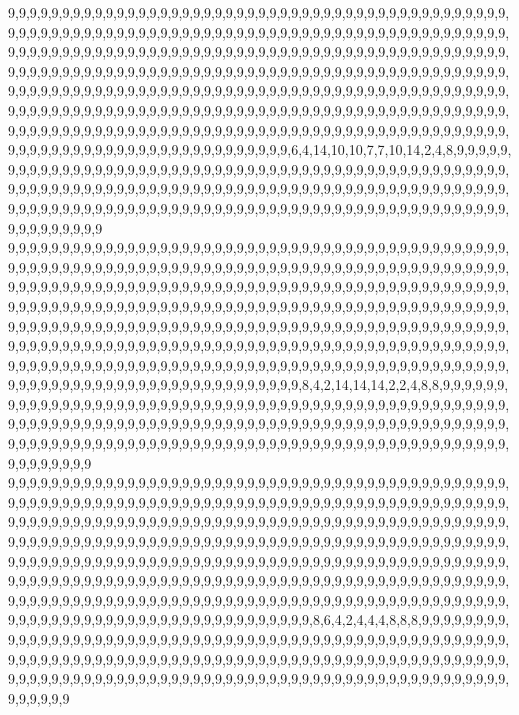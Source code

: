 9,9,9,9,9,9,9,9,9,9,9,9,9,9,9,9,9,9,9,9,9,9,9,9,9,9,9,9,9,9,9,9,9,9,9,9,9,9,9,9,9,9,9,9,9,9,9,9,9,9,9,9,9,9,9,9,9,9,9,9,9,9,9,9,9,9,9,9,9,9,9,9,9,9,9,9,9,9,9,9,9,9,9,9,9,9,9,9,9,9,9,9,9,9,9,9,9,9,9,9,9,9,9,9,9,9,9,9,9,9,9,9,9,9,9,9,9,9,9,9,9,9,9,9,9,9,9,9,9,9,9,9,9,9,9,9,9,9,9,9,9,9,9,9,9,9,9,9,9,9,9,9,9,9,9,9,9,9,9,9,9,9,9,9,9,9,9,9,9,9,9,9,9,9,9,9,9,9,9,9,9,9,9,9,9,9,9,9,9,9,9,9,9,9,9,9,9,9,9,9,9,9,9,9,9,9,9,9,9,9,9,9,9,9,9,9,9,9,9,9,9,9,9,9,9,9,9,9,9,9,9,9,9,9,9,9,9,9,9,9,9,9,9,9,9,9,9,9,9,9,9,9,9,9,9,9,9,9,9,9,9,9,9,9,9,9,9,9,9,9,9,9,9,9,9,9,9,9,9,9,9,9,9,9,9,9,9,9,9,9,9,9,9,9,9,9,9,9,9,9,9,9,9,9,9,9,9,9,9,9,9,9,9,9,9,9,9,9,9,9,9,9,9,9,9,9,9,9,9,9,9,9,9,9,9,9,9,9,9,9,9,9,9,9,9,9,9,9,6,4,14,10,10,7,7,10,14,2,4,8,9,9,9,9,9,9,9,9,9,9,9,9,9,9,9,9,9,9,9,9,9,9,9,9,9,9,9,9,9,9,9,9,9,9,9,9,9,9,9,9,9,9,9,9,9,9,9,9,9,9,9,9,9,9,9,9,9,9,9,9,9,9,9,9,9,9,9,9,9,9,9,9,9,9,9,9,9,9,9,9,9,9,9,9,9,9,9,9,9,9,9,9,9,9,9,9,9,9,9,9,9,9,9,9,9,9,9,9,9,9,9,9,9,9,9,9,9,9,9,9,9,9,9,9,9,9,9,9,9,9,9,9,9,9,9,9,9,9,9,9,9,9,9,9,9,9,9,9,9,9,9,9
9,9,9,9,9,9,9,9,9,9,9,9,9,9,9,9,9,9,9,9,9,9,9,9,9,9,9,9,9,9,9,9,9,9,9,9,9,9,9,9,9,9,9,9,9,9,9,9,9,9,9,9,9,9,9,9,9,9,9,9,9,9,9,9,9,9,9,9,9,9,9,9,9,9,9,9,9,9,9,9,9,9,9,9,9,9,9,9,9,9,9,9,9,9,9,9,9,9,9,9,9,9,9,9,9,9,9,9,9,9,9,9,9,9,9,9,9,9,9,9,9,9,9,9,9,9,9,9,9,9,9,9,9,9,9,9,9,9,9,9,9,9,9,9,9,9,9,9,9,9,9,9,9,9,9,9,9,9,9,9,9,9,9,9,9,9,9,9,9,9,9,9,9,9,9,9,9,9,9,9,9,9,9,9,9,9,9,9,9,9,9,9,9,9,9,9,9,9,9,9,9,9,9,9,9,9,9,9,9,9,9,9,9,9,9,9,9,9,9,9,9,9,9,9,9,9,9,9,9,9,9,9,9,9,9,9,9,9,9,9,9,9,9,9,9,9,9,9,9,9,9,9,9,9,9,9,9,9,9,9,9,9,9,9,9,9,9,9,9,9,9,9,9,9,9,9,9,9,9,9,9,9,9,9,9,9,9,9,9,9,9,9,9,9,9,9,9,9,9,9,9,9,9,9,9,9,9,9,9,9,9,9,9,9,9,9,9,9,9,9,9,9,9,9,9,9,9,9,9,9,9,9,9,9,9,9,9,9,9,9,9,9,9,9,9,9,9,9,9,8,4,2,14,14,14,2,2,4,8,8,9,9,9,9,9,9,9,9,9,9,9,9,9,9,9,9,9,9,9,9,9,9,9,9,9,9,9,9,9,9,9,9,9,9,9,9,9,9,9,9,9,9,9,9,9,9,9,9,9,9,9,9,9,9,9,9,9,9,9,9,9,9,9,9,9,9,9,9,9,9,9,9,9,9,9,9,9,9,9,9,9,9,9,9,9,9,9,9,9,9,9,9,9,9,9,9,9,9,9,9,9,9,9,9,9,9,9,9,9,9,9,9,9,9,9,9,9,9,9,9,9,9,9,9,9,9,9,9,9,9,9,9,9,9,9,9,9,9,9,9,9,9,9,9,9,9,9,9,9,9,9,9
9,9,9,9,9,9,9,9,9,9,9,9,9,9,9,9,9,9,9,9,9,9,9,9,9,9,9,9,9,9,9,9,9,9,9,9,9,9,9,9,9,9,9,9,9,9,9,9,9,9,9,9,9,9,9,9,9,9,9,9,9,9,9,9,9,9,9,9,9,9,9,9,9,9,9,9,9,9,9,9,9,9,9,9,9,9,9,9,9,9,9,9,9,9,9,9,9,9,9,9,9,9,9,9,9,9,9,9,9,9,9,9,9,9,9,9,9,9,9,9,9,9,9,9,9,9,9,9,9,9,9,9,9,9,9,9,9,9,9,9,9,9,9,9,9,9,9,9,9,9,9,9,9,9,9,9,9,9,9,9,9,9,9,9,9,9,9,9,9,9,9,9,9,9,9,9,9,9,9,9,9,9,9,9,9,9,9,9,9,9,9,9,9,9,9,9,9,9,9,9,9,9,9,9,9,9,9,9,9,9,9,9,9,9,9,9,9,9,9,9,9,9,9,9,9,9,9,9,9,9,9,9,9,9,9,9,9,9,9,9,9,9,9,9,9,9,9,9,9,9,9,9,9,9,9,9,9,9,9,9,9,9,9,9,9,9,9,9,9,9,9,9,9,9,9,9,9,9,9,9,9,9,9,9,9,9,9,9,9,9,9,9,9,9,9,9,9,9,9,9,9,9,9,9,9,9,9,9,9,9,9,9,9,9,9,9,9,9,9,9,9,9,9,9,9,9,9,9,9,9,9,9,9,9,9,9,9,9,9,9,9,9,9,9,9,9,9,9,9,9,8,6,4,2,4,4,4,8,8,8,9,9,9,9,9,9,9,9,9,9,9,9,9,9,9,9,9,9,9,9,9,9,9,9,9,9,9,9,9,9,9,9,9,9,9,9,9,9,9,9,9,9,9,9,9,9,9,9,9,9,9,9,9,9,9,9,9,9,9,9,9,9,9,9,9,9,9,9,9,9,9,9,9,9,9,9,9,9,9,9,9,9,9,9,9,9,9,9,9,9,9,9,9,9,9,9,9,9,9,9,9,9,9,9,9,9,9,9,9,9,9,9,9,9,9,9,9,9,9,9,9,9,9,9,9,9,9,9,9,9,9,9,9,9,9,9,9,9,9,9,9,9,9,9,9,9,9,9,9,9,9,9
